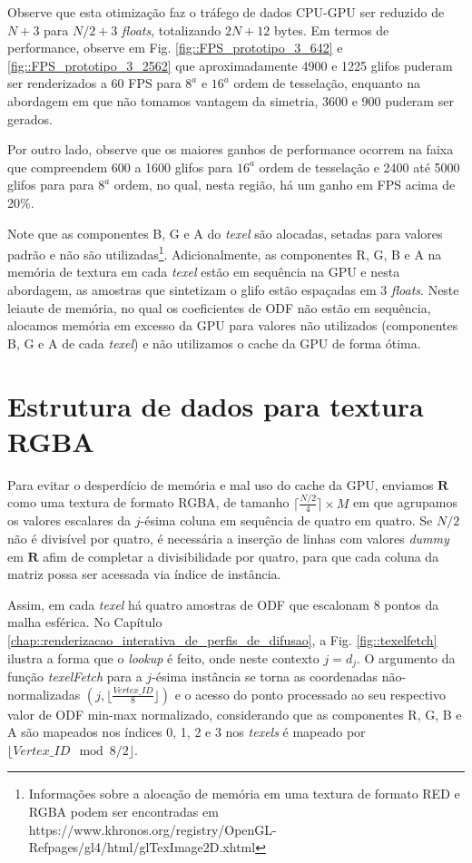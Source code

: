 \documentclass[
    12pt,                %
    oneside,            %
    a4paper,            %
    english,            %
    french,                %
    spanish,            %
    brazil                %
    ]{abntex2}
\begin{document}
Observe que esta otimização faz o tráfego de dados CPU-GPU ser reduzido de $N + 3$ para $N/2 + 3$ \textit{floats}, totalizando $2N + 12$ bytes. Em termos de performance, observe em Fig. \ref{fig::FPS_prototipo_3_642} e \ref{fig::FPS_prototipo_3_2562} que aproximadamente 4900 e 1225 glifos puderam ser renderizados a 60 FPS para $8^a$ e $16^a$ ordem de tesselação, enquanto na abordagem em que não tomamos vantagem da simetria, 3600 e 900 puderam ser gerados.

Por outro lado, observe que os maiores ganhos de performance ocorrem na faixa que compreendem 600 a 1600 glifos para $16^a$ ordem de tesselação e 2400 até 5000 glifos para para $8^a$ ordem, no qual, nesta região, há um ganho em FPS acima de 20\%.

Note que as componentes B, G e A do \textit{texel} são alocadas, setadas para valores padrão e não são utilizadas\footnote{Informações sobre a alocação de memória em uma textura de formato RED e RGBA podem ser encontradas em https://www.khronos.org/registry/OpenGL-Refpages/gl4/html/glTexImage2D.xhtml}. Adicionalmente, as componentes R, G, B e A na memória de textura em cada \textit{texel} estão em sequência na GPU e nesta abordagem, as amostras que sintetizam o glifo estão espaçadas em 3 \textit{floats}. Neste leiaute de memória, no qual os coeficientes de ODF não estão em sequência, alocamos memória em excesso da GPU para valores não utilizados (componentes B, G e A de cada \textit{texel}) e não utilizamos o cache da GPU de forma ótima.



\section{Estrutura de dados para textura RGBA}
\label{sec::estrutura_de_dados_para_textura_RGBA}

Para evitar o desperdício de memória e mal uso do cache da GPU, enviamos $\mathbf{R}$ como uma textura de formato RGBA, de tamanho $\lceil \frac{N/2}{4}\rceil \times M$ em que agrupamos os valores escalares da $j$-ésima coluna em sequência de quatro em quatro. Se $N/2$ não é divisível por quatro, é necessária a inserção de linhas com valores \textit{dummy} em $\mathbf{R}$ afim de completar a divisibilidade por quatro, para que cada coluna da matriz possa ser acessada via índice de instância.

Assim, em cada \textit{texel} há quatro amostras de ODF que escalonam 8 pontos da malha esférica. No Capítulo \ref{chap::renderizacao_interativa_de_perfis_de_difusao}, a Fig. \ref{fig::texelfetch} ilustra a forma que o \textit{lookup} é feito, onde neste contexto $j = d_j$. O argumento da função \textit{texelFetch} para a $j$-ésima instância se torna as coordenadas não-normalizadas $(j, \lfloor \frac{Vertex\_ID}{8} \rfloor)$ e o acesso do ponto processado ao seu respectivo valor de ODF min-max normalizado, considerando que as componentes R, G, B e A são mapeados nos índices 0, 1, 2 e 3 nos \textit{texels} é mapeado por $\lfloor Vertex\_ID \mod{8}/2 \rfloor$.
\end{document}
